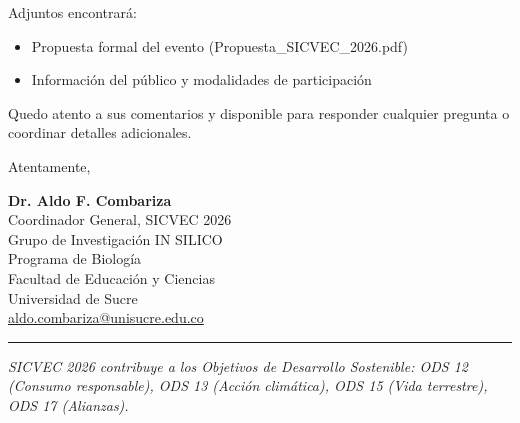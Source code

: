 \documentclass[12pt,a4paper]{article}
\begin{document}
\vspace{0.3cm}

Adjuntos encontrará:
\begin{itemize}
  \item Propuesta formal del evento (Propuesta\_SICVEC\_2026.pdf)
  \item Información del público y modalidades de participación
\end{itemize}

\vspace{0.3cm}

Quedo atento a sus comentarios y disponible para responder cualquier pregunta o coordinar detalles adicionales.

\vspace{0.4cm}

Atentamente,

\vspace{0.4cm}

\textbf{Dr. Aldo F. Combariza}\\
Coordinador General, SICVEC 2026\\
Grupo de Investigación IN SILICO\\
Programa de Biología\\
Facultad de Educación y Ciencias\\
Universidad de Sucre\\
\href{mailto:aldo.combariza@unisucre.edu.co}{aldo.combariza@unisucre.edu.co}

\vspace{0.4cm}

\noindent
\rule{\textwidth}{0.5pt}

\vspace{0.5cm}

\noindent
\textit{\small SICVEC 2026 contribuye a los Objetivos de Desarrollo Sostenible: ODS 12 (Consumo responsable), ODS 13 (Acción climática), ODS 15 (Vida terrestre), ODS 17 (Alianzas).}
\end{document}
